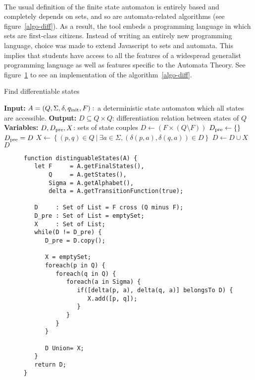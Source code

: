 \paragraph{}
The usual definition of the finite state automaton is entirely based and completely depends on sets, and so are automata-related algorithms (see figure~\ref{algo-diff}). As a result, the tool embeds a programming language in which sets are first-class citizens. Instead of writing an entirely new programming language, choice was made to extend Javascript to sets and automata. This implies that students have access to all the features of a widespread generalist programming language as well as features specific to the Automata Theory. See figure~\ref{audejs-ex} to see an implementation of the algorithm~\ref{algo-diff}. 

\begin{algorithm}
   \caption{Find differentiable states}
   \label{algo-diff}
   \begin{algorithmic}
      \State \textbf{Input:} $A=(Q, \Sigma, \delta, q_{\rm{init}}, F):$ a deterministic state automaton which all states are accessible.
      \State \textbf{Output:} $D\subseteq Q \times Q$: differentiation relation between states of $ Q $
      \State \textbf{Variables:} $D, D_{\rm{pre}}, X$: sets of state couples
      \State $D \gets \left(F\times (Q \setminus F)\right)$
      \State $D_{\rm{pre}} \gets \{\}$
        \State $D_{\rm{pre}}=D$
        \State $X \gets \left\{(p,q) \in Q\: | \: \exists a \in \Sigma, \left(\delta(p,a), \delta(q,a)\right) \in D\right\}$
        \State $D \gets D \cup X$
      \EndWhile
      \State \Return $D$
   \end{algorithmic}
\end{algorithm}

\lstset{language=JavaScript}

\begin{figure}
\label{audejs-ex}
\caption{}
\begin{lstlisting}
function distinguableStates(A) {
   let F     = A.getFinalStates(),
       Q     = A.getStates(),
       Sigma = A.getAlphabet(),
       delta = A.getTransitionFunction(true);

   D     : Set of List = F cross (Q minus F);
   D_pre : Set of List = emptySet;
   X     : Set of List;
   while(D != D_pre) {
      D_pre = D.copy();

      X = emptySet;
      foreach(p in Q) {
         foreach(q in Q) {
            foreach(a in Sigma) {
               if([delta(p, a), delta(q, a)] belongsTo D) {
                  X.add([p, q]);
               }
            }
         }
      }

      D Union= X;
   }
   return D;
}
\end{lstlisting}
\end{figure}
